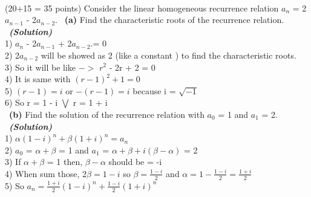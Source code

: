 \documentclass[a4 paper]{article}
\numberwithin{equation}{section}
\newcommand{\problem}[2]{~\\\fbox{\textbf{Problem #1}}\hfill (#2 points)\newline\newline}
\newcommand{\subproblem}[1]{~\newline\textbf{(#1)}}
\newcommand{\solution}{~\newline\textbf{\textit{(Solution)}} }
\newcommand{\0}{\mathbf{0}}
\begin{document}
\newpage
\problem{3}{20+15 = 35}
Consider the linear homogeneous recurrence relation $a_n$ = 2$a_{n-1}$ - 2$a_{n-2}$.
\subproblem{a} Find the characteristic roots of the recurrence relation.
\solution
\newline\\
1)   $a_n$ - 2$a_{n-1}$ + 2$a_{n-2}$.= 0
\newline\\
2)   2$a_{n-2}$ will be showed as 2 (like a constant ) to find the characteristic roots.
\newline\\
3)   So it will be like $->$   $r^2$ - 2r + 2 = 0
\newline\\
4)  It is same with  $(r - 1)^2 + 1 = 0$
\newline\\
5)   $(r - 1) = i$ or $-(r - 1) = i$ because i = $\sqrt{-1}$
\newline\\
6)   So r = 1 - i $\bigvee$ r = 1 + i
\newline\\
\subproblem{b} Find the solution of the recurrence relation with $a_0$ = 1 and $a_1$ = 2.
\solution
\newline\\
1) $\alpha(1-i)^n + \beta(1+i)^n = a_n$
\newline\\
2) $a_0$ =  $\alpha + \beta $ = 1 and $a_1$ = $\alpha + \beta + i(\beta - \alpha)$ = 2
\newline\\
3) If $\alpha + \beta $ = 1 then,  $\beta - \alpha$ should be = -i
\newline\\
4) When sum those, 2$\beta = 1-i$ so $\beta = \frac{1-i}{2}$ and $\alpha = 1 - \frac{1-i}{2} = \frac{1+i}{2}$
\newline\\
5) So $ a_n = \frac{1+i}{2}(1-i)^n + \frac{1-i}{2}(1+i)^n$
\end{document}
